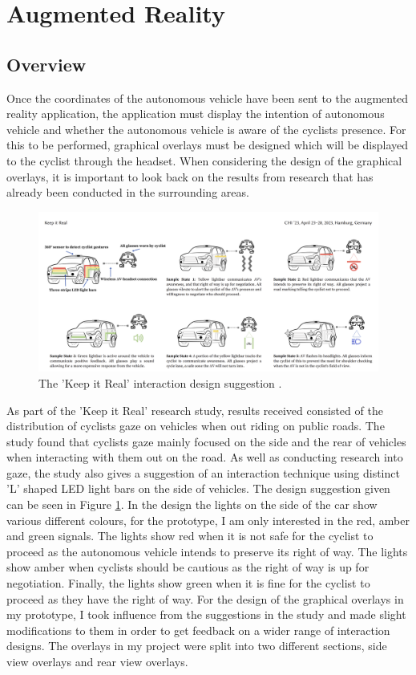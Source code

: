 \documentclass{l4proj}
\begin{document}
\section{Augmented Reality}

\subsection{Overview}

Once the coordinates of the autonomous vehicle have been sent to the augmented reality application, the application must display the intention of autonomous vehicle and whether the autonomous vehicle is aware of the cyclists presence. For this to be performed, graphical overlays must be designed which will be displayed to the cyclist through the headset. When considering the design of the graphical overlays, it is important to look back on the results from research that has already been conducted in the surrounding areas.

\begin{figure}[H]
    \centering
    \includegraphics[width=14cm]{images/keep_it_real.png}
    \caption{The 'Keep it Real' interaction design suggestion \citep{keep_it_real}.}
    \label{fig:keep_it_real}
\end{figure}

As part of the 'Keep it Real' \citep{keep_it_real} research study, results received consisted of the distribution of cyclists gaze on vehicles when out riding on public roads. The study found that cyclists gaze mainly focused on the side and the rear of vehicles when interacting with them out on the road. As well as conducting research into gaze, the study also gives a suggestion of an interaction technique using distinct 'L' shaped LED light bars on the side of vehicles. The design suggestion given can be seen in Figure \ref{fig:keep_it_real}. In the design the lights on the side of the car show various different colours, for the prototype, I am only interested in the red, amber and green signals. The lights show red when it is not safe for the cyclist to proceed as the autonomous vehicle intends to preserve its right of way. The lights show amber when cyclists should be cautious as the right of way is up for negotiation. Finally, the lights show green when it is fine for the cyclist to proceed as they have the right of way. For the design of the graphical overlays in my prototype, I took influence from the suggestions in the study and made slight modifications to them in order to get feedback on a wider range of interaction designs. The overlays in my project were split into two different sections, side view overlays and rear view overlays.
\end{document}
